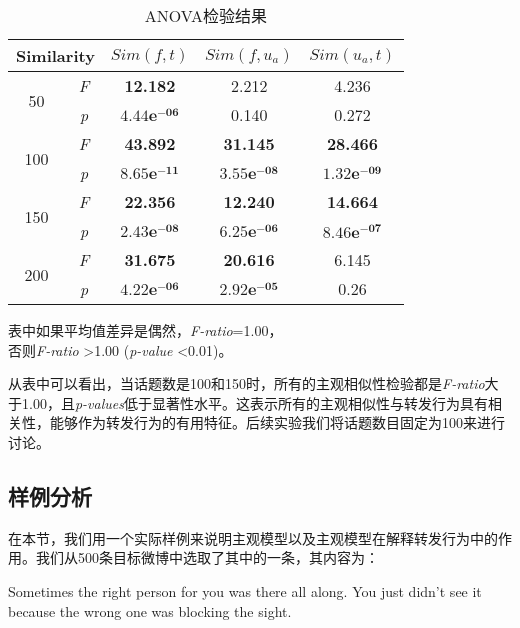\begin{table}[htb]
\scriptsize
\centering
\caption{ANOVA检验结果} 
\label{tab6-3}
\begin{tabular}{|c|c|c|c|c|}
\hline
\multicolumn{2}{|c|}{Similarity}& $ Sim(f,t) $ & $ Sim(f,u_a)  $ & $ Sim(u_a,t)  $\\
\hline
\multirow{2}{*}{50} & \textit{F} & \textbf{12.182} & 2.212 & 4.236 \\
\cline{2-5}
  & \textit{p} &  $\mathbf{4.44e^{-06}}$  & 0.140 & 0.272\\
\hline
\multirow{2}{*}{100} & \textit{F} & \textbf{43.892} & \textbf{31.145} & \textbf{28.466} \\
\cline{2-5}
  & \textit{p} &  $\mathbf{8.65e^{-11}}$  & $\mathbf{3.55e^{-08}}$ & $\mathbf{1.32e^{-09}}$\\
\hline
\multirow{2}{*}{150} & \textit{F} & \textbf{22.356} & \textbf{12.240} & \textbf{14.664} \\
\cline{2-5}
  & \textit{p} &  $\mathbf{2.43e^{-08}}$  & $\mathbf{6.25e^{-06}}$ & $\mathbf{8.46e^{-07}}$\\
\hline
\multirow{2}{*}{200} & \textit{F} & \textbf{31.675} & \textbf{20.616} & 6.145\\
\cline{2-5}
  & \textit{p} &  $\mathbf{4.22e^{-06}}$  & $\mathbf{2.92e^{-05}}$ & 0.26\\
\hline
\end{tabular}
\begin{tablenotes}
  \centering
  \footnotesize
\item 表中如果平均值差异是偶然，\textit{F-ratio}=1.00，\\否则\textit{F-ratio} \textgreater 1.00 (\textit{p-value} \textless 0.01)。
\end{tablenotes}
\end{table}
从表中可以看出，当话题数是100和150时，所有的主观相似性检验都是\textit{F-ratio}大于1.00，且\textit{p-values}低于显著性水平。这表示所有的主观相似性与转发行为具有相关性，能够作为转发行为的有用特征。后续实验我们将话题数目固定为100来进行讨论。

\subsection{样例分析}
\label{example}
在本节，我们用一个实际样例来说明主观模型以及主观模型在解释转发行为中的作用。我们从500条目标微博中选取了其中的一条，其内容为：

\begin{description}
\item Sometimes the right person for you was there all along. You just didn’t see it because the wrong one was blocking the sight.
\end{description}

